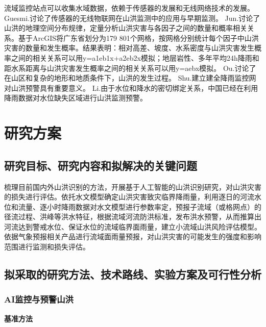 \documentclass{ctexart}
\begin{document}
流域监控站点可以收集水域数据，依赖于传感器的发展和无线网络技术的发展。
Guesmi.\cite{guesmi2017wireless}讨论了传感器的无线物联网在山洪监测中的应用与早期监测。
Jun.\cite{jun2021geospatial}讨论了山洪的地理空间分布规律，定量分析山洪灾害与各因子之间的数量和概率相关关系。基于ArcGIS将广东省划分为179 801个网格，按网格分别统计每个因子中山洪灾害的数量和发生概率。结果表明：相对高差、坡度、水系密度与山洪灾害发生概率之间的相关关系可以用y=a1eb1x+a2eb2x模拟；地层岩性、多年平均24h降雨和距水系距离与山洪灾害发生概率之间的相关关系可以用y=aebx模拟。
Ou.\cite{ouyang2011construction}讨论了在山区和复杂的地形和地质条件下，山洪的发生过程。
Shu.\cite{shu2015discussion}建立建全降雨监控网对山洪预警具有重要意义。
Li.\cite{li2018flash}由于水位和降水的密切绑定关系，中国已经在利用降雨数据对水位缺失区域进行山洪监测预警。

\section{研究方案}

\subsection{研究目标、研究内容和拟解决的关键问题}

梳理目前国内外山洪识别的方法，开展基于人工智能的山洪识别研究，对山洪灾害的损失进行评估。依托水文模型确定山洪灾害致灾临界降雨量，利用逐日的河流水位和流量、逐小时降雨数据对水文模型进行参数率定，预报子流域（或格网点）的径流过程、洪峰等洪水特征，根据流域河流防洪标准，发布洪水预警，从而推算出河流达到警戒水位、保证水位的流域临界面雨量，建立小流域山洪风险评估模型。依据气象预报相关产品进行流域面雨量预报，对山洪灾害的可能发生的强度和影响范围进行监测和损失评估。



\subsection{拟采取的研究方法、技术路线、实验方案及可行性分析}

\subsubsection{AI监控与预警山洪}

\textbf{基准方法}
\end{document}
